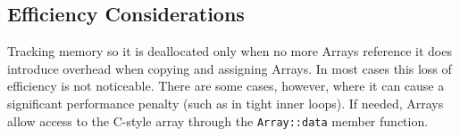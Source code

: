 \subsection{Efficiency Considerations}

Tracking memory so it is deallocated only when no more Arrays reference it does
introduce overhead when copying and assigning Arrays. In most cases this loss of
efficiency is not noticeable. There are some cases, however, where it can cause
a significant performance penalty (such as in tight inner loops). If needed,
Arrays allow access to the C-style array through the \texttt{Array::data} member
function.

